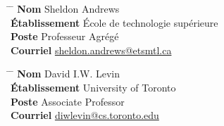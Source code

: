\documentclass[10pt]{article} %
\begin{document}
\noindent\parbox{0.5\textwidth}{
\begin{tabbing}
\hspace{2.75cm} \= \hspace{4cm} \= \kill
{\bf Nom} \> Sheldon Andrews\\ 
{\bf Établissement} \> École de technologie supérieure\\ 
{\bf Poste} \>  Professeur Agrégé \\ 
{\bf Courriel} \> \href{mailto:sheldon.andrews@etsmtl.ca}{sheldon.andrews@etsmtl.ca}
\end{tabbing}}

\noindent\parbox{0.5\textwidth}{
\begin{tabbing}
\hspace{2.75cm} \= \hspace{4cm} \= \kill
{\bf Nom} \> David I.W. Levin\\ 
{\bf Établissement} \> University of Toronto\\ 
{\bf Poste} \>Associate Professor \\ 
{\bf Courriel} \> \href{mailto:diwlevin@cs.toronto.edu}{diwlevin@cs.toronto.edu}
\end{tabbing}}


\end{document}
